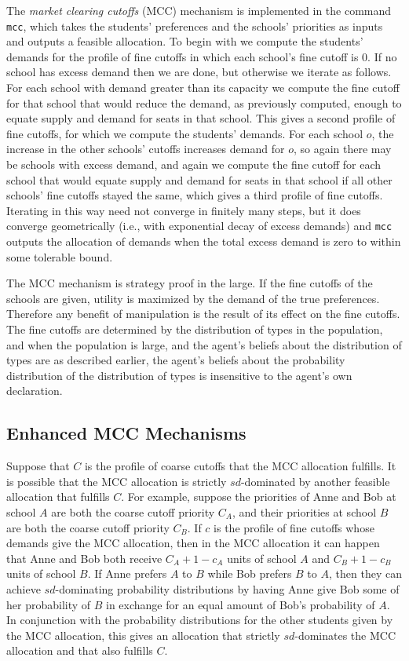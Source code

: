 \documentclass[12pt]{article}
\theoremstyle{definition}
\begin{document}
The \emph{market clearing cutoffs} (MCC) mechanism is implemented in
the command \texttt{mcc}, which takes the students' preferences and
the schools' priorities as inputs and outputs a feasible allocation.
To begin with we compute the students' demands for the profile of fine
cutoffs in which each school's fine cutoff is $0$.  If no school has
excess demand then we are done, but otherwise we iterate as follows.
For each school with demand greater than its capacity we compute the
fine cutoff for that school that would reduce the demand, as
previously computed, enough to equate supply and demand for seats in
that school.  This gives a second profile of fine cutoffs, for which
we compute the students' demands.  For each school $o$, the increase
in the other schools' cutoffs increases demand for $o$, so again there
may be schools with excess demand, and again we compute the fine
cutoff for each school that would equate supply and demand for seats
in that school if all other schools' fine cutoffs stayed the same,
which gives a third profile of fine cutoffs.  Iterating in this way
need not converge in finitely many steps, but it does converge
geometrically (i.e., with exponential decay of excess demands) and
\texttt{mcc} outputs the allocation of demands when the total excess
demand is zero to within some tolerable bound.

The MCC mechanism is strategy proof in the large.  If the fine cutoffs
of the schools are given, utility is maximized by the demand of the
true preferences.  Therefore any benefit of manipulation is the result
of its effect on the fine cutoffs.  The fine cutoffs are determined by
the distribution of types in the population, and when the population
is large, and the agent's beliefs about the distribution of types are
as described earlier, the agent's beliefs about the probability
distribution of the distribution of types is insensitive to the
agent's own declaration.  

\subsection{Enhanced MCC Mechanisms}

Suppose that $C$ is the profile of coarse cutoffs that the MCC
allocation fulfills.  It is possible that the MCC allocation is
strictly $sd$-dominated by another feasible allocation that fulfills
$C$.  For example, suppose the priorities of Anne and Bob at school
$A$ are both the coarse cutoff priority $C_A$, and their priorities at
school $B$ are both the coarse cutoff priority $C_B$.  If $c$ is the
profile of fine cutoffs whose demands give the MCC allocation, then in
the MCC allocation it can happen that Anne and Bob both receive $C_A +
1 - c_A$ units of school $A$ and $C_B + 1 - c_B$ units of school $B$.
If Anne prefers $A$ to $B$ while Bob prefers $B$ to $A$, then they can
achieve $sd$-dominating probability distributions by having Anne give
Bob some of her probability of $B$ in exchange for an equal amount of
Bob's probability of $A$.  In conjunction with the probability
distributions for the other students given by the MCC allocation, this
gives an allocation that strictly $sd$-dominates the MCC allocation
and that also fulfills $C$.
\end{document}
